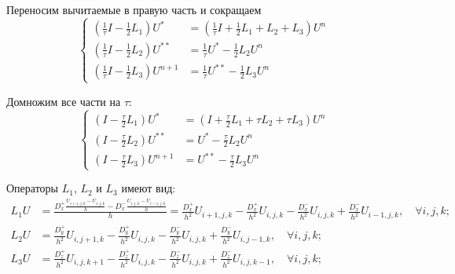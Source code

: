 \documentclass[a4paper,12pt]{article}
\begin{document}
Переносим вычитаемые в правую часть и сокращаем
\begin{equation*}
  \begin{cases}
    \left( \frac{1}{\tau} I - \frac{1}{2} L_1 \right) U^{*} &=
    \left( \frac{1}{\tau} I + \frac{1}{2} L_1 +  L_2 + L_3 \right) U^n \\
    \left( \frac{1}{\tau} I - \frac{1}{2} L_2 \right) U^{**} & =
    \frac{1}{\tau} U^{*} - \frac{1}{2} L_2 U^n \\
    \left( \frac{1}{\tau} I - \frac{1}{2} L_3 \right) U^{n+1} & =
    \frac{1}{\tau} U^{**} - \frac{1}{2} L_3 U^n
  \end{cases}
\end{equation*}

Домножим все части на $\tau$:
\begin{equation*}
  \label{eq:system}
  \begin{cases}
    \left( I - \frac{\tau}{2} L_1 \right) U^{*} &=
    \left( I + \frac{\tau}{2} L_1 +  \tau L_2 + \tau L_3 \right) U^n \\
    \left( I - \frac{\tau}{2} L_2 \right) U^{**} & = U^{*} - \frac{\tau}{2} L_2 U^n \\
    \left( I - \frac{\tau}{2} L_3 \right) U^{n+1} & =  U^{**} - \frac{\tau}{2} L_3 U^n
  \end{cases}
\end{equation*}

Операторы $L_1$, $L_2$ и $L_3$ имеют вид:
\begin{equation*}
  \begin{aligned}
    L_1 U &= \frac{D^+_x \frac{U_{i+1,j,k} - U_{i,j,k}}{h} - D^-_x\frac{U_{i,j,k} - U_{i-1,j,k}}{h}}{h}
    = \frac{D^+_x}{h^2}U_{i+1,j,k} - \frac{D^+_x}{h^2}U_{i,j,k} - \frac{D^-_x}{h^2} U_{i,j,k} + \frac{D^-_x}{h^2}U_{i-1,j,k} , \quad \forall i,j,k; \\
    L_2 U &= \frac{D^+_y}{h^2}U_{i,j+1,k} - \frac{D^+_y}{h^2}U_{i,j,k} - \frac{D^-_y}{h^2} U_{i,j,k} + \frac{D^-_y}{h^2}U_{i,j-1,k} , \quad \forall i,j,k;\\
    L_3 U &= \frac{D^+_z}{h^2}U_{i,j,k+1} - \frac{D^+_z}{h^2}U_{i,j,k} - \frac{D^-_z}{h^2} U_{i,j,k} + \frac{D^-_z}{h^2}U_{i,j,k-1} , \quad \forall i,j,k;
  \end{aligned}
\end{equation*}
\end{document}

